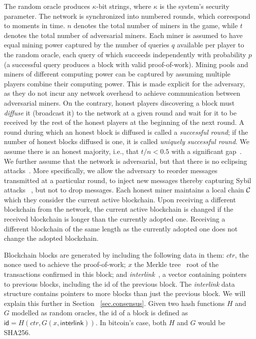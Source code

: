 The random oracle produces $\kappa$-bit strings, where $\kappa$ is the system's
security parameter. The network is synchronized into numbered rounds, which
correspond to moments in time. $n$ denotes the total number of miners in the
game, while $t$ denotes the total number of adversarial miners. Each miner is
assumed to have equal mining power captured by the number of queries $q$
available per player to the random oracle, each query of which succeeds
independently with probability $p$ (a successful query produces a block with
valid proof-of-work). Mining pools and miners of different computing power can
be captured by assuming multiple players combine their computing power. This is
made explicit for the adversary, as they do not incur any network overhead to
achieve communication between adversarial miners. On the contrary, honest
players discovering a block must \textit{diffuse} it (broadcast it) to the
network at a given round and wait for it to be received by the rest of the
honest players at the beginning of the next round. A round during which an
honest block is diffused is called a \textit{successful round}; if the number of
honest blocks diffused is one, it is called \textit{uniquely successful round}.
We assume there is an honest majority, i.e., that $t / n < 0.5$ with a
significant gap~\cite{backbone}. We further assume that the network is
adversarial, but that there is no eclipsing attacks~\cite{heilman2015eclipse}.
More specifically, we allow the adversary to reorder messages transmitted at a
particular round, to inject new messages thereby capturing Sybil attacks~
\cite{sybil}, but not to drop messages. Each honest miner maintains a local
chain $\mathcal{C}$ which they consider the current active blockchain. Upon receiving
a different blockchain from the network, the current active blockchain is
changed if the received blockchain is longer than the currently adopted one.
Receiving a different blockchain of the same length as the currently adopted one
does not change the adopted blockchain.

Blockchain blocks are generated by including the following data in them: $ctr$,
the nonce used to achieve the proof-of-work; $x$ the Merkle tree~\cite{merkle}
root of the transactions confirmed in this block; and
\textit{interlink}~\cite{KLS}, a vector containing pointers to previous blocks,
including the id of the previous block. The \textit{interlink} data structure
contains pointers to more blocks than just the previous block. We will explain
this further in Section~ \ref{sec.consensus}. Given two hash functions $H$ and
$G$ modelled as random oracles, the id of a block is defined as $\textsf{id} =
H(ctr, G(x, \textsf{interlink}))$. In bitcoin's case, both $H$ and $G$ would be
SHA256.

